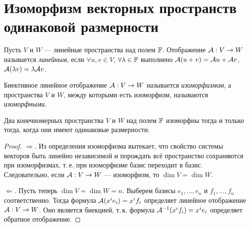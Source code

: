 \section{Изоморфизм векторных пространств одинаковой размерности}

\begin{definition}
    Пусть $V$ и $W$ --- линейные пространства над полем $\mathbb{F}$. Отображение $\mathcal{A}: V \to W$ называется \textit{линейным}, если $\forall u, v \in V$, $\forall \lambda \in \mathbb{F}$ выполнено $\mathcal{A}(u + v) = \mathcal{A} u + \mathcal{A} v$, $\mathcal{A}(\lambda v) = \lambda\mathcal{A} v$.
\end{definition}

\begin{definition}
    Биективное линейное отображение $\mathcal{A}: V \to W$ называется \textit{изоморфизмом}, а пространства $V$ и $W$, между которыми есть изоморфизм, называются \textit{изоморфными}.
\end{definition}

\begin{theorem}
    Два конечномерных пространства $V$ и $W$ над полем $\mathbb{F}$ изоморфны тогда и только тогда, когда они имеют одинаковые размерности.
\end{theorem}

\begin{proof}
    $\Rightarrow$. Из определения изоморфизма вытекает, что свойство системы векторов быть линейно независимой и порождать всё пространство сохраняются при изоморфизмах, т.\,е. при изоморфизме базис переходит в базис. Следовательно, если $\mathcal{A}: V \to W$ --- изоморфизм, то $\dim V = \dim W$.

    $\Leftarrow$. Пусть теперь $\dim V = \dim W = n$. Выберем базисы $e_1, \ldots, e_n$ и $f_1, \ldots, f_n$ соответственно. Тогда формула $\mathcal{A}(x^ie_i) = x^if_i$ определяет линейное отображение $\mathcal{A}: V \to W$. Оно является биекцией, т.\,к. формула $\mathcal{A}^{-1}(x^if_i) = x^ie_i$ определяет обратное отображение.
\end{proof}

